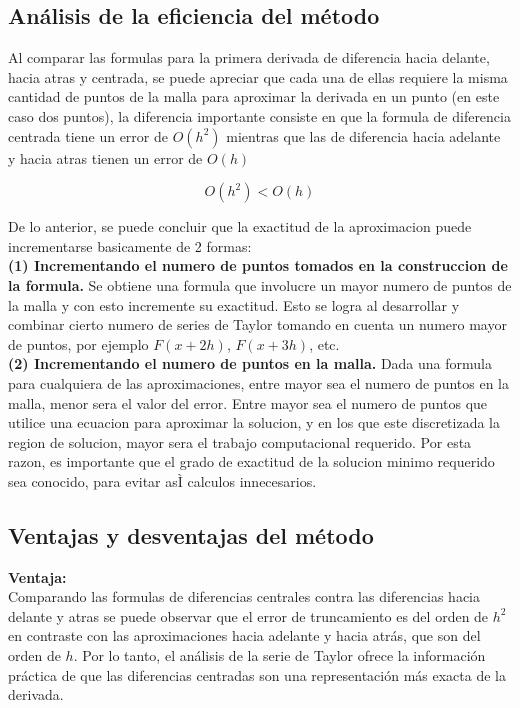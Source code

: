 \documentclass[journal,transmag]{IEEEtran}
\theoremstyle{mytheoremstyle}
\theoremstyle{mytheoremstyle}
\theoremstyle{myproblemstyle}
\begin{document}
\subsection{Análisis de la eficiencia del método}
Al comparar las formulas para la primera derivada de diferencia hacia delante, hacia atras y centrada, se puede apreciar que cada una de ellas requiere la misma cantidad de puntos de la malla para aproximar la derivada en un punto (en este caso dos puntos), la diferencia importante consiste en que la formula de diferencia centrada tiene un error de $O(h^2)$ mientras que las de diferencia hacia adelante y hacia atras tienen un error de $O(h)$

\begin{equation}
    O(h^2) < O(h)
\end{equation}

De lo anterior, se puede concluir que la exactitud de la aproximacion puede incrementarse basicamente de 2 formas:\\

\textbf{(1) Incrementando el numero de puntos tomados en la construccion de la formula.} Se obtiene
una formula que involucre un mayor numero de puntos de la malla y con esto incremente su exactitud. Esto se logra al desarrollar y combinar cierto numero de series de Taylor tomando en cuenta un numero mayor de puntos, por ejemplo $F(x + 2h)$, $F(x+3h)$, etc.\\

\textbf{(2) Incrementando el numero de puntos en la malla.} Dada una formula para cualquiera de las
aproximaciones, entre mayor sea el numero de puntos en la malla, menor sera el valor del error. Entre mayor sea el numero de puntos que utilice una ecuacion para aproximar la solucion, y en los que este discretizada la region de solucion, mayor sera el trabajo computacional requerido. Por esta razon, es importante que el grado de exactitud de la solucion minimo requerido sea conocido, para evitar asÌ calculos innecesarios.

\subsection{Ventajas y desventajas del método}
\textbf{Ventaja:}\\
 Comparando las formulas de diferencias centrales contra las diferencias hacia delante y atras se puede observar que el error de truncamiento es del orden de $h^2$ en contraste con las aproximaciones hacia adelante y hacia atrás, que son del orden de $h$. Por lo tanto, el análisis de la serie de Taylor ofrece la información práctica de que las diferencias centradas son una representación más exacta de la derivada.\\
 
\end{document}
